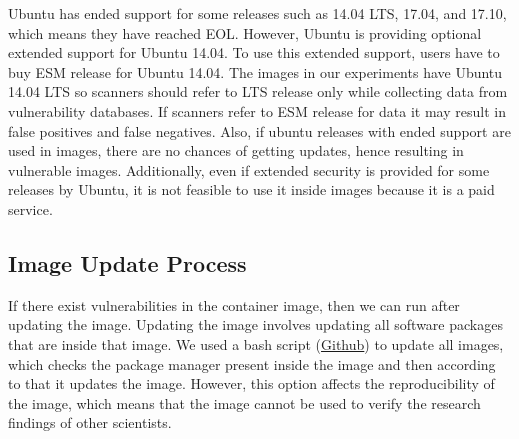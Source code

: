 \documentclass[a4paper,num-refs]{oup-contemporary}
\begin{document}
Ubuntu has ended support for some releases such as 14.04 LTS,
17.04, and 17.10, which means they have reached EOL. However, Ubuntu is providing optional extended support for Ubuntu 14.04.
To use this extended support, users have to buy ESM release for Ubuntu 14.04.
The images in our experiments have Ubuntu 14.04 LTS so scanners should refer
to LTS release only while collecting data from vulnerability databases. If scanners refer to ESM release for data it may result
in false positives and false negatives.
Also, if ubuntu releases with ended support are used in images, there are no chances of getting updates, hence
resulting in vulnerable images. Additionally, even if extended security is provided for some releases by Ubuntu, it is
not feasible to use it inside images because it is a paid service. 

\subsection{Image Update Process}

If there exist vulnerabilities in the container image, then we can
run after updating the
image. Updating the image involves updating all software packages that are
inside that image. We used a bash script (\href{https://github.com/kaurbhupinder/Vulnerability-Analysis}{Github}) 
to update all images, which checks the
package manager present inside the image and then according to that it
updates the image. However, this option affects the reproducibility
of the image, which means that the image cannot be used to verify the research
findings of other scientists.

\end{document}
